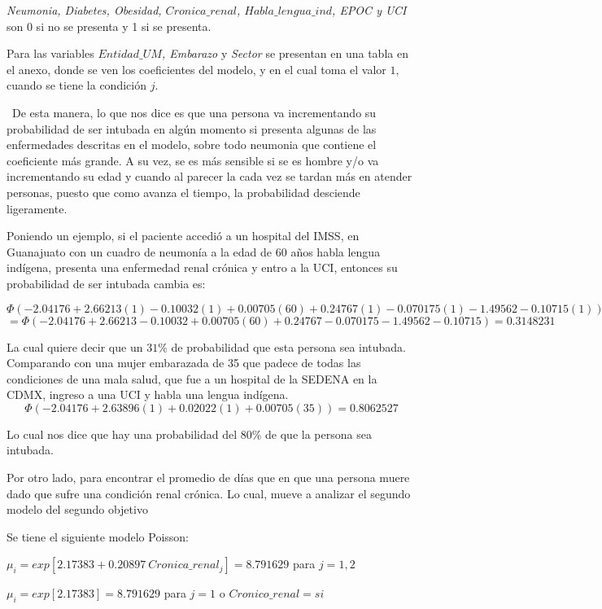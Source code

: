 \documentclass[12pt,a4paper,oneside]{article}
\begin{document}
\textit{Neumonia, Diabetes, Obesidad, $Cronica\_renal$, $Habla\_lengua\_ind$, EPOC y UCI} son 0 si no se presenta y 1 si se presenta.

Para las variables \textit{$Entidad\_UM$, Embarazo} y \textit{Sector} se presentan en una tabla en el anexo, donde se ven los coeficientes del modelo, y en el cual toma el valor $1$, cuando se tiene la condición $j$.

\
De esta manera, lo que nos dice es que una persona va incrementando su probabilidad de ser intubada en algún momento si presenta algunas de las enfermedades descritas en el modelo, sobre todo neumonia que contiene el coeficiente más grande. A su vez, se es más sensible si se es hombre y/o va incrementando su edad y cuando al parecer la cada vez se tardan más en atender personas, puesto que como avanza el tiempo, la probabilidad desciende ligeramente.

Poniendo un ejemplo, si el paciente accedió a un hospital del IMSS, en Guanajuato con un cuadro de neumonía a la edad de 60 años habla lengua indígena, presenta una enfermedad renal crónica y entro a la UCI, entonces su probabilidad de ser intubada cambia es:

$$\Phi(- 2.04176 + 2.66213 (1) - 0.10032 (1) + 0.00705 (60) + 0.24767 (1) - 0.070175 (1) - 1.49562  - 0.10715 (1))$$
$$= \Phi(- 2.04176 + 2.66213 - 0.10032 + 0.00705 (60) + 0.24767 - 0.070175 - 1.49562  - 0.10715) = 0.3148231$$

La cual quiere decir que un $31\%$ de probabilidad que esta persona sea intubada.
Comparando con una mujer embarazada de 35 que padece de todas las condiciones de una mala salud, que fue a un hospital de la SEDENA en la CDMX, ingreso a una UCI y habla una lengua indígena.
$$\Phi(- 2.04176 + 2.63896 (1) + 0.02022 (1) + 0.00705 (35)) = 0.8062527$$

Lo cual nos dice que hay una probabilidad del $80\%$ de que la persona sea intubada.

Por otro lado, para encontrar el promedio de días que en que una persona muere dado que sufre una condición renal crónica. Lo cual, mueve a analizar el segundo modelo del segundo objetivo

Se tiene el siguiente modelo Poisson:

$\mu_i = exp\left[2.17383 + 0.20897 \ Cronica\_renal_j \right] = 8.791629$ \hspace{2.5cm} para $j=1,2$

$\mu_i = exp\left[2.17383 \right] = 8.791629$ \hspace{3.8cm} para $j=1$ o $Cronico\_renal=si$
\end{document}
